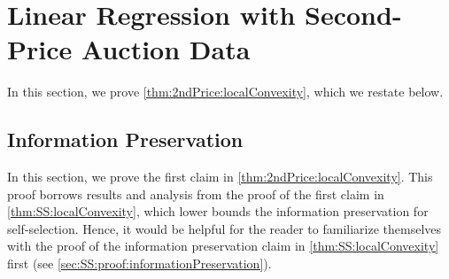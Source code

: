 \documentclass[11pt,letterpaper]{article}
\theoremstyle{plain}
\theoremstyle{definition}
\theoremstyle{remark}
\begin{document}
{{\section{Linear Regression with Second-Price Auction Data}\label{sec:2ndPrice}






In this section, we prove \cref{thm:2ndPrice:localConvexity}, which we restate below.
\thmsecondPriceLocalConvexity*


\subsection{Information Preservation}\label{sec:2ndPrice:proof:informationPreservation}
    
    In this section, we prove the first claim in \cref{thm:2ndPrice:localConvexity}.
    This proof borrows results and analysis from the proof of the first claim in \cref{thm:SS:localConvexity}, which lower bounds the information preservation for self-selection.
    Hence, it would be helpful for the reader to familiarize themselves with the proof of the information preservation claim in \cref{thm:SS:localConvexity} first (see  \cref{sec:SS:proof:informationPreservation}).


}}
\end{document}
